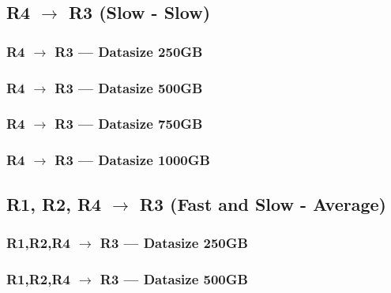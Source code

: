 \subsection{R4 $\rightarrow$ R3 (Slow - Slow)}
\subsubsection{R4 $\rightarrow$ R3 --- Datasize 250GB}



\newpage
\subsubsection{R4 $\rightarrow$ R3 --- Datasize 500GB}



\newpage
\subsubsection{R4 $\rightarrow$ R3 --- Datasize 750GB}



\newpage
\subsubsection{R4 $\rightarrow$ R3 --- Datasize 1000GB}




\subsection{R1, R2, R4 $\rightarrow$ R3 (Fast and Slow - Average)}
\subsubsection{R1,R2,R4 $\rightarrow$ R3 --- Datasize 250GB}



\newpage
\subsubsection{R1,R2,R4 $\rightarrow$ R3 --- Datasize 500GB}



